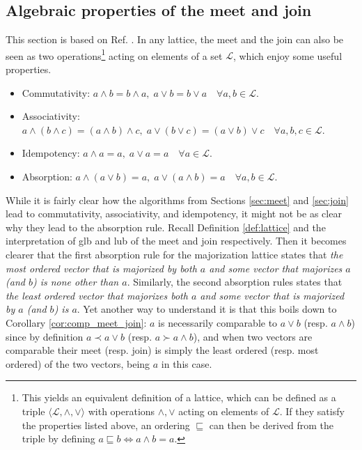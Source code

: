  
\subsection{Algebraic properties of the meet and join} \label{sec:algebraic_properties}

This section is based on Ref. \cite[pp. 39--41]{davey_introduction_2002}. In any lattice, the meet and the join can also be seen as two operations\footnote{This yields an equivalent definition of a lattice, which can be defined as a triple $\langle \mathcal{L}, \wedge, \vee \rangle$ with operations $\wedge, \vee$ acting on elements of $\mathcal{L}$. If they satisfy the properties listed above, an ordering $\sqsubseteq$ can then be derived from the triple by defining $a \sqsubseteq b \iff a \wedge b = a$.}
acting on elements of a set $\mathcal{L}$, which enjoy some useful properties.

\begin{itemize} \label{it:meet_join_properties}
    \item Commutativity: $a \wedge b = b \wedge a, \; a \vee b = b \vee a \quad \forall a, b \in \mathcal{L}$.
    \item Associativity: $a \wedge (b \wedge c) = (a \wedge b) \wedge c, \;
                            a \vee (b \vee c) = (a \vee b) \vee c \quad \forall a, b, c \in \mathcal{L}$.
    \item Idempotency: $a \wedge a = a, \; a \vee a = a \quad \forall a \in \mathcal{L}$.
    \item Absorption: $a \wedge (a \vee b) = a, \; a \vee (a \wedge b) = a \quad \forall a, b \in \mathcal{L}$.
\end{itemize}

While it is fairly clear how the algorithms from Sections \ref{sec:meet} and \ref{sec:join} lead to commutativity, associativity, and idempotency, it might not be as clear why they lead to the absorption rule. Recall Definition \ref{def:lattice} and the interpretation of glb and lub of the meet and join respectively. Then it becomes clearer that the first absorption rule for the majorization lattice states that \textit{the most ordered vector that is majorized by both $a$ and some vector that majorizes $a$ (and $b$) is none other than $a$}. Similarly, the second absorption rules states that \textit{the least ordered vector that majorizes both $a$ and some vector that is majorized by $a$ (and $b$) is $a$}. Yet another way to understand it is that this boils down to Corollary \ref{cor:comp_meet_join}: $a$ is necessarily comparable to $a \vee b$ (resp. $a \wedge b$) since by definition $a \prec a \vee b$ (resp. $a \succ a \wedge b$), and when two vectors are comparable their meet (resp. join) is simply the least ordered (resp. most ordered) of the two vectors, being $a$ in this case.

